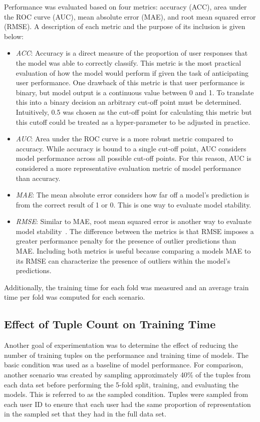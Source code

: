 \documentclass[letterpaper, 12pt, captions=tableabove]{scrreprt}
\begin{document}
			Performance was evaluated based on four metrics: accuracy (ACC), area under the ROC curve (AUC), mean absolute error (MAE), and root mean squared error (RMSE). A description of each metric and the purpose of its inclusion is given below:
			\begin{itemize}
				\item \emph{ACC}: Accuracy is a direct measure of the proportion of user responses that the model was able to correctly classify. This metric is the most practical evaluation of how the model would perform if given the task of anticipating user performance. One drawback of this metric is that user performance is binary, but model output is a continuous value between 0 and 1. To translate this into a binary decision an arbitrary cut-off point must be determined. Intuitively, 0.5 was chosen as the cut-off point for calculating this metric but this cutoff could be treated as a hyper-parameter to be adjusted in practice.

				\item \emph{AUC}: Area under the ROC curve is a more robust metric compared to accuracy. While accuracy is bound to a single cut-off point, AUC considers model performance across all possible cut-off points. For this reason, AUC is considered a more representative evaluation metric of model performance than accuracy.

				\item \emph{MAE}: The mean absolute error considers how far off a model's prediction is from the correct result of 1 or 0. This is one way to evaluate model stability.

				\item \emph{RMSE}: Similar to MAE, root mean squared error is another way to evaluate model stability~\cite{wang2023}. The difference between the metrics is that RMSE imposes a greater performance penalty for the presence of outlier predictions than MAE. Including both metrics is useful because comparing a models MAE to its RMSE can characterize the presence of outliers within the model's predictions.
			\end{itemize}
Additionally, the training time for each fold was measured and an average train time per fold was computed for each scenario.

		\subsection{Effect of Tuple Count on Training Time}
		\label{sub:comparingTrainingSpeed}
			Another goal of experimentation was to determine the effect of reducing the number of training tuples on the performance and training time of models. The basic condition was used as a baseline of model performance. For comparison, another scenario was created by sampling approximately 40\% of the tuples from each data set before performing the 5-fold split, training, and evaluating the models. This is referred to as the sampled condition. Tuples were sampled from each user ID to ensure that each user had the same proportion of representation in the sampled set that they had in the full data set.
		
\end{document}
